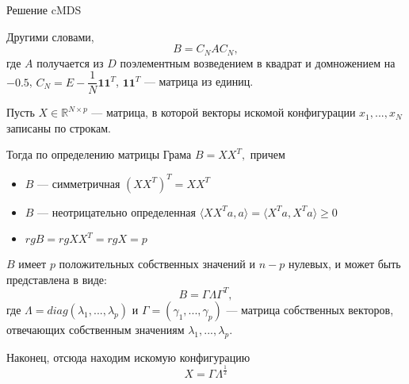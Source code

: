 \documentclass[9pt]{beamer}
\begin{document}
\begin{frame}{Решение cMDS}

Другими словами, 
    \begin{equation}
    \label{gram}
    B = C_N A C_N, 
    \end{equation}
    где $A$ получается из $D$ поэлементным возведением в квадрат и домножением на $-0.5$, $C_N = E - \dfrac{1}{N} \textbf{1} \textbf{1}^T$, $\textbf{1} \textbf{1}^T$ --- матрица из единиц.
    
    Пусть $X \in \mathbb{R}^{N \times p}$ --- матрица, в которой векторы искомой конфигурации $x_1, ..., x_N$ записаны по строкам.
    
    Тогда по определению матрицы Грама $B = XX^T,$ причем 
    \begin{itemize}
        \item $B$ --- симметричная $(XX^T)^T = XX^T$ 
        \item $B$ --- неотрицательно определенная $\langle XX^Ta, a\rangle = \langle X^Ta, X^Ta\rangle \geqslant 0$
        \item $rg{B} = rg{XX^T} = rg{X} = p$
    \end{itemize}
    $B$ имеет $p$ положительных собственных значений и $n-p$ нулевых, и может быть представлена в виде:
\begin{equation}
\label{spectral}
    B = \Gamma \Lambda \Gamma^T,
\end{equation}
где $\Lambda = diag(\lambda_1, ..., \lambda_p)$ и $\Gamma = (\gamma_1, ..., \gamma_p)$ --- матрица собственных векторов, отвечающих собственным значениям $\lambda_1, ..., \lambda_p$.

Наконец, отсюда находим искомую конфигурацию
\begin{equation}
\label{X}
    X = \Gamma \Lambda^{\frac{1}{2}}
\end{equation}
    
\end{frame}
\end{document}
